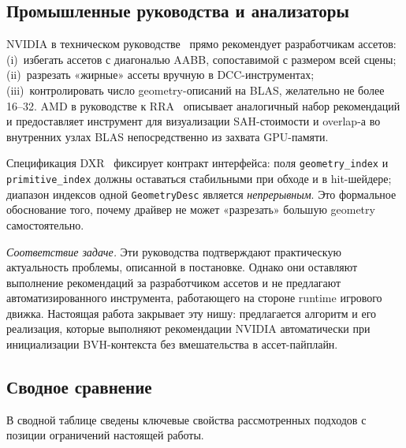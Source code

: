 \subsection{Промышленные руководства и анализаторы}

NVIDIA в техническом руководстве~\cite{nvOptMesh} прямо рекомендует
разработчикам ассетов: (i)~избегать ассетов с диагональю
AABB, сопоставимой с размером всей сцены; (ii)~разрезать «жирные»
ассеты вручную в DCC-инструментах; (iii)~контролировать число
geometry-описаний на BLAS, желательно не более 16--32. AMD в
руководстве к RRA~\cite{rraManual} описывает аналогичный набор
рекомендаций и предоставляет инструмент для визуализации
SAH-стоимости и overlap-а во внутренних узлах BLAS непосредственно
из захвата GPU-памяти.

Спецификация DXR~\cite{dxrSpec} фиксирует контракт интерфейса:
поля \texttt{geometry\_index} и \texttt{primitive\_index} должны
оставаться стабильными при обходе и в hit-шейдере; диапазон
индексов одной \texttt{GeometryDesc} является \emph{непрерывным}. Это формальное
обоснование того, почему драйвер не может «разрезать» большую
geometry самостоятельно.

\textit{Соответствие задаче.} Эти руководства подтверждают практическую
актуальность проблемы, описанной в постановке. Однако они
оставляют выполнение рекомендаций за разработчиком ассетов и не
предлагают автоматизированного инструмента, работающего на
стороне runtime игрового движка. Настоящая работа закрывает эту
нишу: предлагается алгоритм и его реализация, которые выполняют
рекомендации NVIDIA автоматически при инициализации BVH-контекста
без вмешательства в ассет-пайплайн.

\subsection{Сводное сравнение}

В сводной таблице сведены ключевые свойства
рассмотренных подходов с позиции ограничений настоящей работы.

